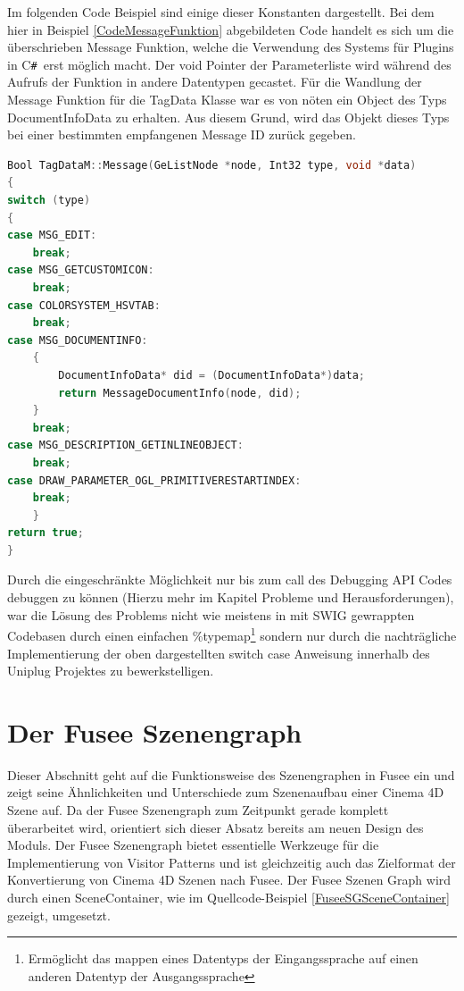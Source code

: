 \documentclass[pagesize, paper=a4, fontsize=12pt, titlepage=true, headings=small, headnosepline, abstractoff, liststotoc, nochapterprefix, plainheadsepline, twoside]{scrreprt}
\newcommand{\CSS}{C\texttt{\# }}
\begin{document}
Im folgenden Code Beispiel sind einige dieser Konstanten dargestellt. Bei dem hier in Beispiel \ref{CodeMessageFunktion} abgebildeten Code handelt es sich um die überschrieben Message Funktion, welche die Verwendung des Systems für Plugins in \CSS erst möglich macht. Der void Pointer der Parameterliste wird während des Aufrufs der Funktion in andere Datentypen gecastet. Für die Wandlung der Message Funktion für die TagData Klasse war es von nöten ein Object des Typs DocumentInfoData zu erhalten. Aus diesem Grund, wird das Objekt dieses Typs bei einer bestimmten empfangenen Message ID zurück gegeben.
\begin{lstlisting}[language=C++, caption = Überschreiben der Message Funktion des TagData Datentyps, label=CodeMessageFunktion]
Bool TagDataM::Message(GeListNode *node, Int32 type, void *data)
{
switch (type)
{
case MSG_EDIT:
	break;
case MSG_GETCUSTOMICON:
	break;
case COLORSYSTEM_HSVTAB:
	break;
case MSG_DOCUMENTINFO:
	{
		DocumentInfoData* did = (DocumentInfoData*)data;
		return MessageDocumentInfo(node, did);
	}
	break;
case MSG_DESCRIPTION_GETINLINEOBJECT:
	break;
case DRAW_PARAMETER_OGL_PRIMITIVERESTARTINDEX:
	break;
	}
return true;
}
\end{lstlisting}

Durch die eingeschränkte  Möglichkeit nur bis zum call des Debugging API Codes debuggen zu können (Hierzu mehr im Kapitel Probleme und Herausforderungen), war die Lösung des Problems nicht wie meistens in mit SWIG gewrappten Codebasen durch einen einfachen \%typemap\footnote{Ermöglicht das mappen eines Datentyps der Eingangssprache auf einen anderen Datentyp der Ausgangssprache} sondern nur durch die nachträgliche Implementierung der oben dargestellten switch case Anweisung innerhalb des Uniplug Projektes zu bewerkstelligen. 

\section{Der Fusee Szenengraph}
Dieser Abschnitt geht auf die Funktionsweise des Szenengraphen in Fusee ein und zeigt seine Ähnlichkeiten und Unterschiede zum Szenenaufbau einer Cinema 4D Szene auf. Da der Fusee Szenengraph zum Zeitpunkt gerade komplett überarbeitet wird, orientiert sich dieser Absatz bereits am neuen Design des Moduls. Der Fusee Szenengraph bietet essentielle Werkzeuge für die Implementierung von Visitor Patterns und ist gleichzeitig auch das Zielformat der Konvertierung von Cinema 4D Szenen nach Fusee. Der Fusee Szenen Graph wird durch einen SceneContainer, wie im Quellcode-Beispiel \ref{FuseeSGSceneContainer} gezeigt, umgesetzt.
\end{document}

